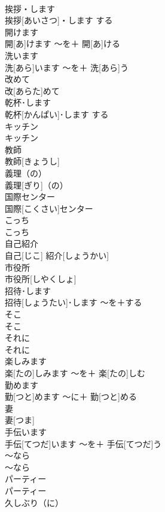 \documentclass[8pt]{extreport}
\begin{document}
\begin{CJK}{UTF8}{min}
\\	挨拶・します	
\\	挨拶[あいさつ]・します	する	
\\	開けます	
\\	開[あ]けます	〜を＋ 開[あ]ける	
\\	洗います	
\\	洗[あら]います	〜を＋ 洗[あら]う	
\\	改めて	
\\	改[あらた]めて		
\\	乾杯･します	
\\	乾杯[かんぱい]･します	する	
\\	キッチン	
\\	キッチン		
\\	教師	
\\	教師[きょうし]		
\\	義理（の）	
\\	義理[ぎり]（の）		
\\	国際センター	
\\	国際[こくさい]センター		
\\	こっち	
\\	こっち		
\\	自己紹介	
\\	自己[じこ] 紹介[しょうかい]		
\\	市役所	
\\	市役所[しやくしょ]		
\\	招待･します	
\\	招待[しょうたい]･します	〜を＋する	
\\	そこ	
\\	そこ		
\\	それに	
\\	それに		
\\	楽しみます	
\\	楽[たの]しみます	〜を＋ 楽[たの]しむ	
\\	勤めます	
\\	勤[つと]めます	〜に＋ 勤[つと]める	
\\	妻	
\\	妻[つま]		
\\	手伝います	
\\	手伝[てつだ]います	〜を＋ 手伝[てつだ]う	
\\	〜なら	
\\	〜なら		
\\	パーティー	
\\	パーティー		
\\	久しぶり（に）	

\end{CJK}
\end{document}
